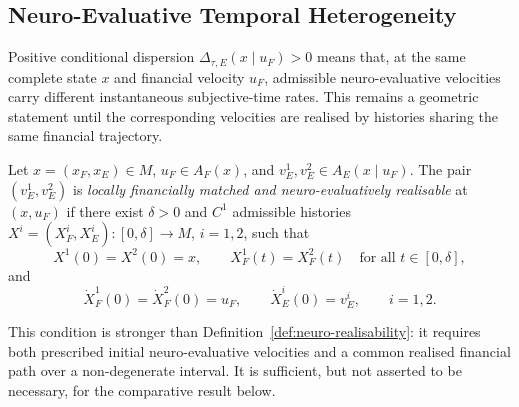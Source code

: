 \documentclass[graybox,natbib]{SNmult}
\providecommand{\1}{}
\renewcommand{\1}{\mathbbm 1}
\begin{document}
\subsection{Neuro-Evaluative Temporal Heterogeneity}
\label{subsec:neuro-temporal-heterogeneity}

Positive conditional dispersion
\(\Delta_{\tau,E}(x\mid u_F)>0\) means that, at the same complete state \(x\)
and financial velocity \(u_F\), admissible neuro-evaluative velocities carry
different instantaneous subjective-time rates. This remains a geometric
statement until the corresponding velocities are realised by histories sharing
the same financial trajectory.

\begin{definition}
\label{def:matched-neuro-realisability}

Let \(x=(x_F,x_E)\in M\), \(u_F\in A_F(x)\), and
\(v_E^1,v_E^2\in A_E(x\mid u_F)\). The pair
\((v_E^1,v_E^2)\) is \emph{locally financially matched and
neuro-evaluatively realisable} at \((x,u_F)\) if there exist
\(\delta>0\) and \(C^1\) admissible histories
\(X^i=(X_F^i,X_E^i):[0,\delta]\rightarrow M\), \(i=1,2\), such that
\begin{equation}
X^1(0)=X^2(0)=x,
\qquad
X_F^1(t)=X_F^2(t)
\quad
\text{for all }t\in[0,\delta],
\label{eq:matched-financial-path}
\end{equation}
and
\begin{equation}
\dot X_F^1(0)=\dot X_F^2(0)=u_F,
\qquad
\dot X_E^i(0)=v_E^i,
\qquad i=1,2.
\label{eq:matched-neuro-velocities}
\end{equation}
\end{definition}

This condition is stronger than
Definition~\ref{def:neuro-realisability}: it requires both prescribed initial
neuro-evaluative velocities and a common realised financial path over a
non-degenerate interval. It is sufficient, but not asserted to be necessary,
for the comparative result below.
\end{document}
